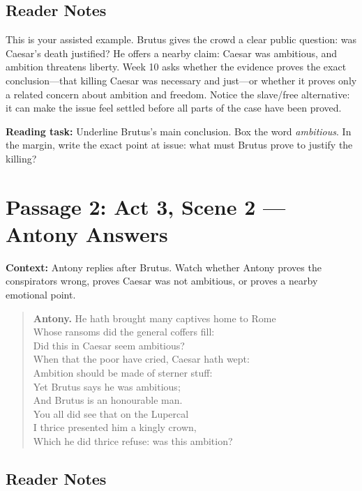 \documentclass[12pt]{article}
\newenvironment{playpassage}{\begin{quote}\footnotesize\setlength{\parskip}{0.08em}\setlength{\parindent}{0pt}}{\end{quote}}
\newcommand{\speaker}[1]{\textbf{#1.}}
\begin{document}
\subsection*{Reader Notes}

This is your assisted example. Brutus gives the crowd a clear public question: was Caesar's death justified? He offers a nearby claim: Caesar was ambitious, and ambition threatens liberty. Week 10 asks whether the evidence proves the exact conclusion---that killing Caesar was necessary and just---or whether it proves only a related concern about ambition and freedom. Notice the slave/free alternative: it can make the issue feel settled before all parts of the case have been proved.

\textbf{Reading task:} Underline Brutus's main conclusion. Box the word \textit{ambitious}. In the margin, write the exact point at issue: what must Brutus prove to justify the killing?

\newpage

\section*{Passage 2: Act 3, Scene 2 --- Antony Answers}

\textbf{Context:} Antony replies after Brutus. Watch whether Antony proves the conspirators wrong, proves Caesar was not ambitious, or proves a nearby emotional point.

\begin{playpassage}
\speaker{Antony} He hath brought many captives home to Rome\\
Whose ransoms did the general coffers fill:\\
Did this in Caesar seem ambitious?\\
When that the poor have cried, Caesar hath wept:\\
Ambition should be made of sterner stuff:\\
Yet Brutus says he was ambitious;\\
And Brutus is an honourable man.\\
You all did see that on the Lupercal\\
I thrice presented him a kingly crown,\\
Which he did thrice refuse: was this ambition?
\end{playpassage}

\subsection*{Reader Notes}
\end{document}
